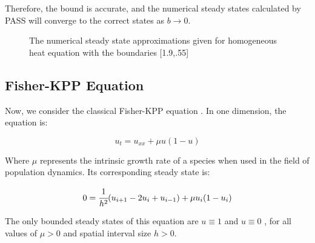\documentclass{article}
\begin{document}
Therefore, the bound is accurate, and the numerical steady states calculated by PASS will converge to the correct states as $b \rightarrow 0$.

\begin{figure*}
\begin{center}
\caption{The numerical steady state approximations given for homogeneous heat equation with the boundaries [1.9,.55]}
\label{heats}
\end{center}
\end{figure*}

\subsection{Fisher-KPP Equation}

Now, we consider the classical Fisher-KPP equation \citep{Fisher}. In one dimension, the equation is:

\begin{equation}
    \label{Fisher}
    u_t = u_{xx} + \mu u (1-u)
\end{equation}

\noindent Where $\mu$ represents the intrinsic growth rate of a species \citep{Numerical_RD_1} when used in the field of population dynamics. Its corresponding steady state is:

\begin{equation}
    \label{discrete Fisher}
    0 = \cfrac{1}{h^2} (u_{i+1} - 2u_i + u_{i-1}) + \mu u_i (1-u_i)
\end{equation}

\noindent The only bounded steady states of this equation are $u \equiv 1$ and $u \equiv 0$ \citep{Fisher}, for all values of $\mu > 0$ and spatial interval size $h > 0$.
\end{document}
